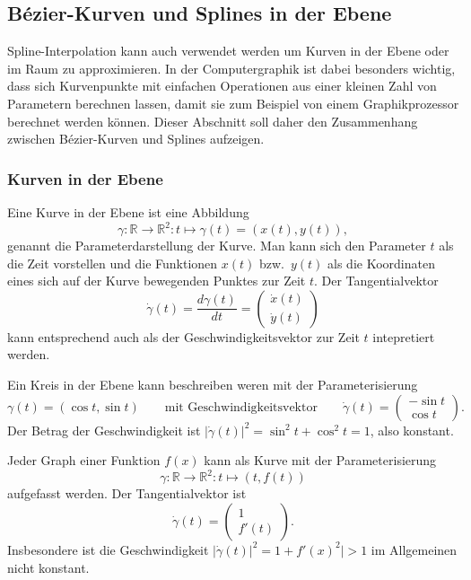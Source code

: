 %
%
%

\subsection{Bézier-Kurven und Splines in der Ebene
\label{buch:subsection:bezier}}
Spline-Interpolation kann auch verwendet werden um Kurven in der Ebene
oder im Raum zu approximieren.
In der Computergraphik ist dabei besonders wichtig, dass sich Kurvenpunkte
mit einfachen Operationen aus einer kleinen Zahl von Parametern berechnen
lassen, damit sie zum Beispiel von einem Graphikprozessor berechnet
werden können.
Dieser Abschnitt soll daher den Zusammenhang zwischen Bézier-Kurven und
Splines aufzeigen.

%
%
\subsubsection{Kurven in der Ebene}
Eine Kurve in der Ebene ist eine Abbildung
\[
\gamma \colon \mathbb R \to \mathbb R^2 : t \mapsto \gamma(t) = (x(t),y(t)),
\]
genannt die Parameterdarstellung der Kurve.
Man kann sich den Parameter $t$ als die Zeit vorstellen und die Funktionen
$x(t)$ bzw.~$y(t)$ als die Koordinaten eines sich auf der Kurve bewegenden
Punktes zur Zeit $t$.
Der Tangentialvektor
\[
\dot{\gamma}(t)
=
\frac{d\gamma(t)}{dt}
=
\begin{pmatrix}
\dot{x}(t)\\\dot{y}(t)
\end{pmatrix}
\]
kann entsprechend auch als der Geschwindigkeitsvektor zur Zeit $t$ 
intepretiert werden.

\begin{beispiel}
Ein Kreis in der Ebene kann beschreiben weren mit der Parameterisierung
\[
\gamma(t) = (\cos t, \sin t)
\qquad
\text{mit Geschwindigkeitsvektor}
\qquad
\dot{\gamma}(t)
=
\begin{pmatrix}
-\sin t\\\cos t
\end{pmatrix}.
\]
Der Betrag der Geschwindigkeit ist $|\dot{\gamma}(t)|^2=\sin^2t+\cos^2t=1$,
also konstant.
\end{beispiel}

\begin{beispiel}
Jeder Graph einer Funktion $f(x)$ kann als Kurve mit der Parameterisierung
\[
\gamma \colon \mathbb R\to\mathbb R^2 : t \mapsto (t, f(t))
\]
aufgefasst werden.
Der Tangentialvektor ist
\[
\dot{\gamma}(t)
=
\begin{pmatrix}
1\\f'(t)
\end{pmatrix}.
\]
Insbesondere ist die Geschwindigkeit $|\dot{\gamma}(t)|^2=1+f'(x)^2|>1$
im Allgemeinen nicht konstant.
\end{beispiel}

